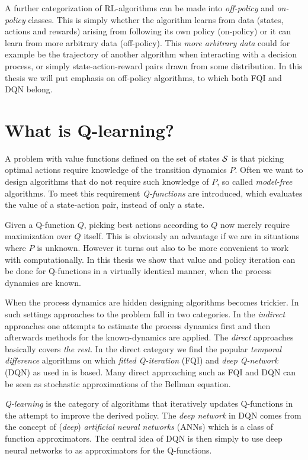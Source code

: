 A further categorization of RL-algorithms can be made into
\emph{off-policy} and \emph{on-policy} classes.
This is simply whether the algorithm learns from data
(states, actions and rewards) arising from 
following its own policy (on-policy) or it can learn from more
arbitrary data (off-policy).
This \emph{more arbitrary data} could for example be
the trajectory of another algorithm when interacting with a decision process,
or simply state-action-reward pairs drawn from some distribution.
In this thesis we will put emphasis on off-policy algorithms,
to which both FQI and DQN belong.


\section{What is Q-learning?}

A problem with value functions defined on the set of states $\mathcal{S}$ is that
picking optimal actions require knowledge of the transition dynamics $P$.
Often we want to design algorithms that do not require such knowledge of $P$,
so called \emph{model-free} algorithms.
To meet this requirement \emph{Q-functions} are introduced, which evaluates
the value of a state-action pair, instead of only a state.

Given a Q-function $Q$, picking best actions according to $Q$ now
merely require maximization over $Q$ itself.
This is obviously an advantage if we are in situations where $P$ is
unknown. %
However it turns out also to be more convenient to work with computationally.
In this thesis we show that value and policy iteration can be done
for Q-functions in a virtually identical manner, when the process dynamics
are known.

When the process dynamics are hidden designing algorithms becomes trickier.
In such settings approaches to the problem
fall in two categories. In the \emph{indirect} approaches
one attempts to estimate the process dynamics first and then afterwards
methods for the known-dynamics are applied.
The \emph{direct} approaches basically covers \emph{the rest}.
In the direct category we find the popular \emph{temporal difference}
algorithms on which \emph{fitted Q-iteration} (FQI)
and \emph{deep Q-network} (DQN) as used in  is based.
Many direct approaching such as FQI and DQN can be seen as
stochastic approximations of the Bellman equation.

\emph{Q-learning} is the category of algorithms that iteratively updates
Q-functions in the attempt to improve the derived policy.
The \emph{deep network} in DQN comes from the concept of (\emph{deep})
\emph{artificial neural networks} (ANNs)
which is a class of function approximators.
The central idea of DQN is then simply to use deep neural networks
to as approximators for the Q-functions.



